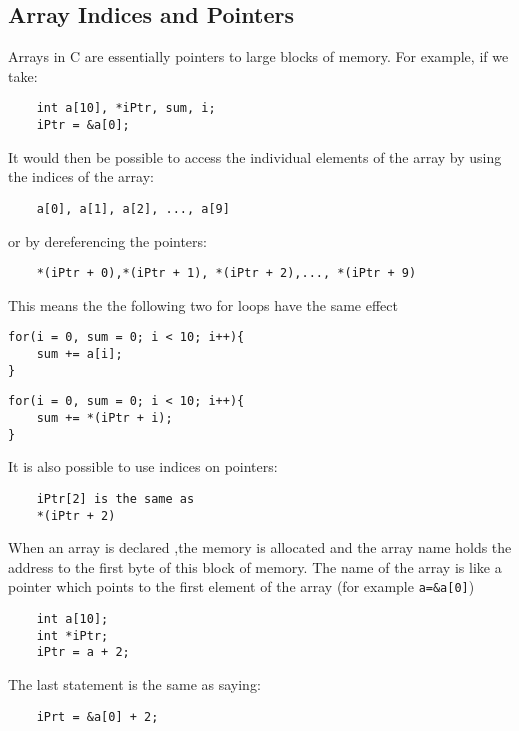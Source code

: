 \subsection{Array Indices and Pointers}
Arrays in C are essentially pointers to large blocks of memory. For example, if we take:
\begin{verbatim}
    int a[10], *iPtr, sum, i;
    iPtr = &a[0];
\end{verbatim}
It would then be possible to access the individual elements of the array by using the indices of the array:
\begin{verbatim}
    a[0], a[1], a[2], ..., a[9]
\end{verbatim}
or by dereferencing the pointers:
\begin{verbatim}
    *(iPtr + 0),*(iPtr + 1), *(iPtr + 2),..., *(iPtr + 9) 
\end{verbatim}
This means the the following two for loops have the same effect\\

\begin{minipage}{0.45\textwidth}
\begin{verbatim}
for(i = 0, sum = 0; i < 10; i++){
    sum += a[i];
}
\end{verbatim}
\end{minipage}\hfill
\begin{minipage}{0.45\textwidth}
\begin{verbatim}
for(i = 0, sum = 0; i < 10; i++){
    sum += *(iPtr + i);
}
\end{verbatim}
\end{minipage}
\vspace{1em}

It is also possible to use indices on pointers:
\begin{verbatim}
    iPtr[2] is the same as
    *(iPtr + 2)
\end{verbatim}

When an array is declared ,the memory is allocated and the array name holds the address to the first byte of this block of memory. The name of the array is like a pointer which points to the first element of the array (for example \verb|a=&a[0]|)
\begin{verbatim}
    int a[10];
    int *iPtr;
    iPtr = a + 2;
\end{verbatim}
The last statement is the same as saying:
\begin{verbatim}
    iPrt = &a[0] + 2;
\end{verbatim}

